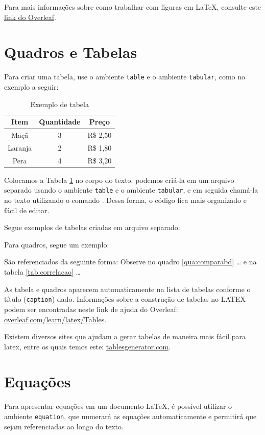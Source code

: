 Para mais informações sobre como trabalhar com figuras em \LaTeX, consulte este \href{https://www.overleaf.com/learn/latex/Inserting_Images}{link do Overleaf}.

\section{Quadros e Tabelas}\label{sec:tabelas}
Para criar uma tabela, use o ambiente \texttt{table} e o ambiente \texttt{tabular}, como no exemplo a seguir:
\begin{table}[h]
  \caption{Exemplo de tabela}
  \centering
  \begin{tabular}{ccc}
    \hline
    \textbf{Item} & \textbf{Quantidade} & \textbf{Preço} \\
    \hline
    Maçã & 3 & R\$ 2,50 \\
    \hline
    Laranja & 2 & R\$ 1,80 \\
    \hline
    Pera & 4 & R\$ 3,20 \\
    \hline
  \end{tabular}
  \label{tab:exemplo}
\end{table}

Colocamos a Tabela \ref{tab:exemplo} no corpo do texto. podemos criá-la em um arquivo separado usando o ambiente \texttt{table} e o ambiente \texttt{tabular}, e em seguida chamá-la no texto utilizando o comando \verb||. Dessa forma, o código fica mais organizado e fácil de editar. 

Segue  exemplos de tabelas criadas em arquivo separado:




Para quadros, segue um exemplo:


São referenciados da seguinte forma: Observe no quadro  \ref{qua:comparabd} … e na  tabela \ref{tab:correlacao} …

As tabela e quadros aparecem automaticamente na lista de tabelas conforme o título (\verb|caption|) dado. Informações sobre a construção de tabelas no LATEX podem ser encontradas  neste link de ajuda do Overleaf: \href{https://www.overleaf.com/learn/latex/Tables}{overleaf.com/learn/latex/Tables}.

Existem diversos sites que ajudam a gerar tabelas de maneira mais fácil para latex, entre os quais temos este: \href{https://www.tablesgenerator.com}{tablesgenerator.com}.
\section{Equações}\label{sec:equacoes}
Para apresentar equações em um documento \LaTeX, é possível utilizar o ambiente \texttt{equation}, que numerará as equações automaticamente e permitirá que sejam referenciadas ao longo do texto.

